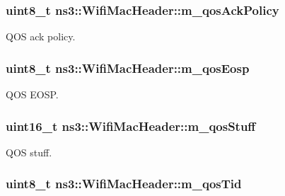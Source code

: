 \subsubsection[{\texorpdfstring{m\+\_\+qos\+Ack\+Policy}{m_qosAckPolicy}}]{\setlength{\rightskip}{0pt plus 5cm}uint8\+\_\+t ns3\+::\+Wifi\+Mac\+Header\+::m\+\_\+qos\+Ack\+Policy\hspace{0.3cm}{\ttfamily [private]}}\hypertarget{classns3_1_1WifiMacHeader_afe3899401c9a7f154ffb8a210b94e3e2}{}\label{classns3_1_1WifiMacHeader_afe3899401c9a7f154ffb8a210b94e3e2}


Q\+OS ack policy. 

\subsubsection[{\texorpdfstring{m\+\_\+qos\+Eosp}{m_qosEosp}}]{\setlength{\rightskip}{0pt plus 5cm}uint8\+\_\+t ns3\+::\+Wifi\+Mac\+Header\+::m\+\_\+qos\+Eosp\hspace{0.3cm}{\ttfamily [private]}}\hypertarget{classns3_1_1WifiMacHeader_a05f7f1f21fdb154ae379532b09cece0d}{}\label{classns3_1_1WifiMacHeader_a05f7f1f21fdb154ae379532b09cece0d}


Q\+OS E\+O\+SP. 

\subsubsection[{\texorpdfstring{m\+\_\+qos\+Stuff}{m_qosStuff}}]{\setlength{\rightskip}{0pt plus 5cm}uint16\+\_\+t ns3\+::\+Wifi\+Mac\+Header\+::m\+\_\+qos\+Stuff\hspace{0.3cm}{\ttfamily [private]}}\hypertarget{classns3_1_1WifiMacHeader_aad74ef79def1a6968dbef1eb80842d33}{}\label{classns3_1_1WifiMacHeader_aad74ef79def1a6968dbef1eb80842d33}


Q\+OS stuff. 

\subsubsection[{\texorpdfstring{m\+\_\+qos\+Tid}{m_qosTid}}]{\setlength{\rightskip}{0pt plus 5cm}uint8\+\_\+t ns3\+::\+Wifi\+Mac\+Header\+::m\+\_\+qos\+Tid\hspace{0.3cm}{\ttfamily [private]}}\hypertarget{classns3_1_1WifiMacHeader_a08f5caad43fd89a6dffc840c6ed82d40}{}\label{classns3_1_1WifiMacHeader_a08f5caad43fd89a6dffc840c6ed82d40}


